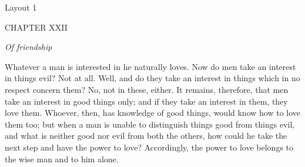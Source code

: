 

Layout 1

CHAPTER XXII

\emph{Of friendship}

Whatever a man is interested in he naturally loves. Now do men take an interest in things evil? Not at all. Well, and do they take an interest in things which in no respect concern them? No, not in these, either. It remains, therefore, that men take an interest in good things only; and if they take an interest in them, they love them. Whoever, then, has knowledge of good things, would know how to love them too; but when a man is unable to distinguish things good from things evil, and what is neither good nor evil from both the others, how could he take the next step and have the power to love? Accordingly, the power to love belongs to the wise man and to him alone.

